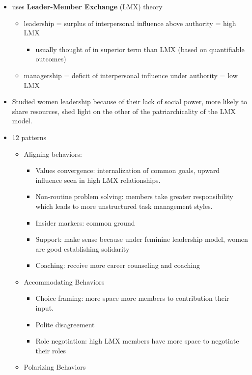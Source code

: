\documentclass[
]{book}
\providecommand{\tightlist}{%
  \setlength{\itemsep}{0pt}\setlength{\parskip}{0pt}}
\begin{document}
\begin{itemize}
\item
  uses \textbf{Leader-Member Exchange} (LMX) theory

  \begin{itemize}
  \item
    leadership = surplus of interpersonal influence above authority = high LMX

    \begin{itemize}
    \tightlist
    \item
      usually thought of in superior term than LMX (based on quantifiable outcomes)
    \end{itemize}
  \item
    managership = deficit of interpersonal influence under authority = low LMX
  \end{itemize}
\item
  Studied women leadership because of their lack of social power, more likely to share resources, shed light on the other of the patriarchicality of the LMX model.
\item
  12 patterns

  \begin{itemize}
  \item
    Aligning behaviors:

    \begin{itemize}
    \item
      Values convergence: internalization of common goals, upward influence seen in high LMX relationships.
    \item
      Non-routine problem solving: members take greater responsibility which leads to more unstructured task management styles.
    \item
      Insider markers: common ground
    \item
      Support: make sense because under feminine leadership model, women are good establishing solidarity
    \item
      Coaching: receive more career counseling and coaching
    \end{itemize}
  \item
    Accommodating Behaviors

    \begin{itemize}
    \item
      Choice framing: more space more members to contribution their input.
    \item
      Polite disagreement
    \item
      Role negotiation: high LMX members have more space to negotiate their roles
    \end{itemize}
  \item
    Polarizing Behaviors


\end{itemize}
\end{itemize}
\end{document}
